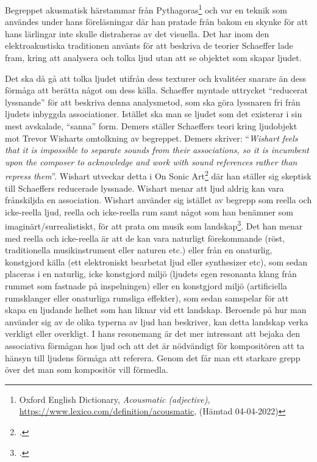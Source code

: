 \documentclass{article}
\begin{document}
Begreppet akusmatisk härstammar från Pythagoras\footnote{Oxford English Dictionary, \emph{Acousmatic
(adjective)}, \url{https://www.lexico.com/definition/acousmatic}, (Hämtad 04-04-2022)} och var en teknik som
användes under hans föreläsningar där han pratade från bakom en skynke för att hans lärlingar inte skulle
distraheras av det visuella. Det har inom den elektroakustiska traditionen använts för att beskriva de teorier
Schaeffer lade fram, kring att analysera och tolka ljud utan att se objektet som skapar ljudet.

Det ska då gå att tolka ljudet utifrån dess texturer och kvalitéer snarare än dess förmåga att berätta något
om dess källa. Schaeffer myntade uttrycket ``reducerat lyssnande'' för att beskriva denna analysmetod, som ska
göra lyssnaren fri från ljudets inbyggda associationer. Istället ska man se ljudet som det existerar i sin
mest avskalade, ``sanna'' form. Demers ställer Schaeffers teori kring ljudobjekt mot Trevor Wisharts
omtolkning av begreppet. Demers skriver: ``\emph{Wishart feels that it is impossible to separate sounds from
their associations, so it is incumbent upon the composer to acknowledge and work with sound references rather
than repress them}''. Wishart utveckar detta i On Sonic Art\footcite{TrevorWishart} där han ställer sig
skeptisk till Schaeffers reducerade lyssnade. Wishart menar att ljud aldrig kan vara frånskiljda en
association. Wishart använder sig istället av begrepp som reella och icke-reella ljud, reella och icke-reella
rum samt något som han benämner som imaginärt/surrealistiskt, för att prata om musik som
landskap\footcite[144-147]{TrevorWishart}. Det han menar med reella och icke-reella är att de kan vara
naturligt förekommande (röst, traditionella musikinstrument eller naturen etc.) eller från en onaturlig,
konstgjord källa (ett elektroniskt bearbetat ljud eller synthesizer etc), som sedan placeras i en naturlig,
icke konstgjord miljö (ljudets egen resonanta klang från rummet som fastnade på inspelningen) eller en
konstgjord miljö (artificiella rumsklanger eller onaturliga rumsliga effekter), som sedan samspelar för att
skapa en ljudande helhet som han liknar vid ett landskap. Beroende på hur man använder sig av de olika typerna
av ljud han beskriver, kan detta landskap verka verkligt eller overkligt. I hans resonemang är det mer
intressant att bejaka den associativa förmågan hos ljud och att det är nödvändigt för kompositören att ta
hänsyn till ljudens förmåga att referera. Genom det får man ett starkare grepp över det man som kompositör
vill förmedla.
\end{document}
